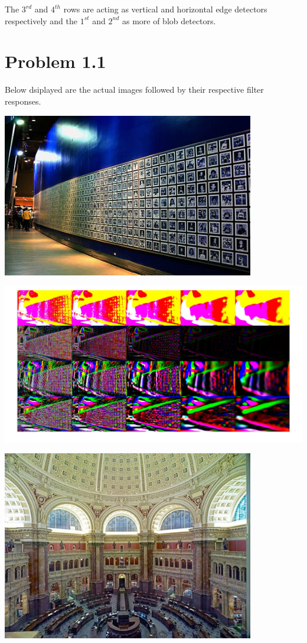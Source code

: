 \documentclass[a4paper,11pt]{article}
\begin{document}
The  $3^{rd}$ and $4^{th}$ rows are acting as vertical and horizontal edge detectors respectively and the $1^{st}$ and $2^{nd}$ as  more of blob detectors.\\
\vfill
\section*{Problem 1.1}
Below dsiplayed are the actual images followed by their respective filter responses.
\begin{center}
\includegraphics[width=11cm]{release/matlab/fig4}
\end{center}
\includegraphics[width=\textwidth]{release/matlab/Montage4}
\begin{center}
	\includegraphics[width=11cm]{release/matlab/fig5}
\end{center}
\end{document}
